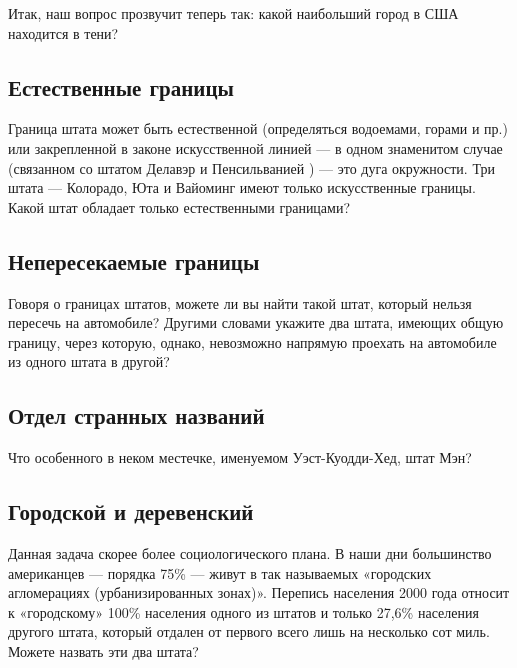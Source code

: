 Итак,  наш вопрос прозвучит теперь так: какой наибольший город в США находится в тени?




\subsection*{Естественные границы}%


Граница штата может быть естественной (определяться водоемами, горами и пр.) или 
закрепленной в законе искусственной линией --- в одном знаменитом случае (связанном со штатом Делавэр и Пенсильванией ) --- это дуга окружности. Три штата --- Колорадо, Юта и Вайоминг имеют только искусственные границы. Какой штат обладает только естественными границами?




\subsection*{Непересекаемые границы}%


Говоря о границах штатов, можете ли вы найти такой штат, который нельзя пересечь на автомобиле? Другими словами укажите два штата, имеющих общую границу, через которую, однако, невозможно  напрямую проехать на автомобиле из одного штата в другой?




\subsection*{Отдел странных названий}%


Что особенного в неком местечке, именуемом  Уэст-Куодди-Хед, %
штат Мэн?




\subsection*{Городской и деревенский}%


Данная задача скорее более социологического плана. 
В наши дни большинство американцев --- порядка 75\% --- живут в так называемых «городских агломерациях (урбанизированных зонах)». 
Перепись населения 2000 года относит к «городскому» 100\% населения одного из штатов и только 27,6\% населения другого штата, который отдален от первого всего лишь на несколько сот миль.  
Можете назвать эти два штата?




